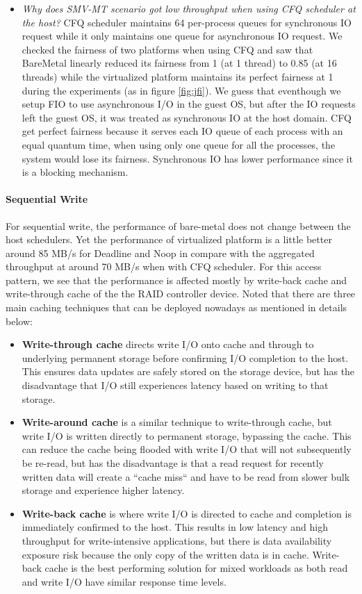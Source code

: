 \documentclass{acmsig}
\begin{document}
\begin{itemize}
 \item \textit{Why does SMV-MT scenario got low throughput when using CFQ scheduler at the host?} CFQ scheduler maintains 64 per-process queues for synchronous IO request while it only maintains one queue for asynchronous IO request. We checked the fairness of two platforms when using CFQ and saw that BareMetal linearly reduced its fairness from 1 (at 1 thread) to 0.85 (at 16 threads) while the virtualized platform maintains its perfect fairness at 1 during the experiments (as in figure \ref{fig:jfi}). We guess that eventhough we setup FIO to use asynchronous I/O in the guest OS, but after the IO requests left the guest OS, it was treated as synchronous IO at the host domain. CFQ get perfect fairness because it serves each IO queue of each process with an equal quantum time, when using only one queue for all the processes, the system would lose its fairness. Synchronous IO has lower performance since it is a blocking mechanism.
\end{itemize}
\paragraph{Sequential Write}
For sequential write, the performance of bare-metal does not change between the host schedulers. Yet the performance of virtualized platform is a little better around 85 MB/s for Deadline and Noop in compare with the aggregated throughput at around 70 MB/s when with CFQ scheduler.
For this access pattern, we see that the performance is affected mostly by write-back cache and write-through cache of the the RAID controller device. Noted that there are three main caching techniques that can be deployed nowadays as mentioned in details below:
\begin{itemize}
  \item \textbf{Write-through cache} directs write I/O onto cache and through to underlying permanent storage before confirming I/O completion to the host. This ensures data updates are safely stored on the storage device, but has the disadvantage that I/O still experiences latency based on writing to that storage.
  \item \textbf{Write-around cache} is a similar technique to write-through cache, but write I/O is written directly to permanent storage, bypassing the cache. This can reduce the cache being flooded with write I/O that will not subsequently be re-read, but has the disadvantage is that a read request for recently written data will create a ``cache miss`` and have to be read from slower bulk storage and experience higher latency.
  \item \textbf{Write-back cache} is where write I/O is directed to cache and completion is immediately confirmed to the host. This results in low latency and high throughput for write-intensive applications, but there is data availability exposure risk because the only copy of the written data is in cache. Write-back cache is the best performing solution for mixed workloads as both read and write I/O have similar response time levels.
\end{itemize}
\end{document}
